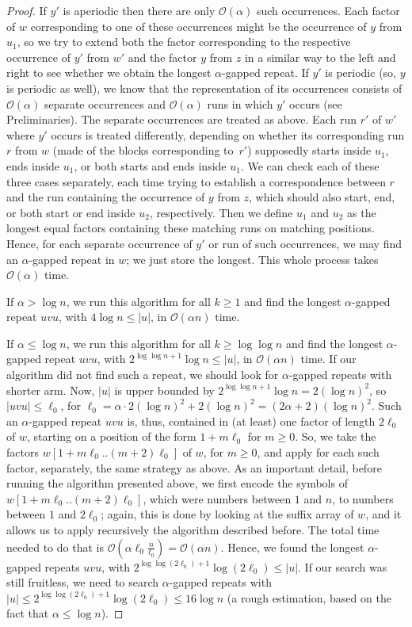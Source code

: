 \documentclass[final]{dmtcs-episciences}
\newcommand{\bigo}{{\mathcal O}}
\begin{document}
\begin{proof}
If $y'$ is aperiodic then there are only $\bigo(\alpha)$ such occurrences. Each factor of $w$ corresponding to one of these occurrences might be the occurrence of $y$ from $u_1$, so we try to extend both the factor corresponding to the respective occurrence of $y'$ from $w'$ and the factor $y$ from $z$ in a similar way to the left and right to see whether we obtain the longest $\alpha$-gapped repeat. If $y'$ is periodic (so, $y$ is periodic as well), we know that the representation of its occurrences consists of $\bigo(\alpha)$ separate occurrences and $\bigo(\alpha)$ runs in which $y'$ occurs (see Preliminaries). The separate occurrences are treated as above. Each run $r'$ of $w'$ where $y'$ occurs is treated differently, depending on whether its corresponding run $r$ from $w$ (made of the blocks corresponding to~$r'$) supposedly starts inside $u_1$, ends inside $u_1$, or both starts and ends inside $u_1$. We can check each of these three cases separately, each time trying to establish a correspondence between $r$ and the run containing the occurrence of $y$ from $z$, which should also start, end, or both start or end inside $u_2$, respectively. Then we define $u_1$ and $u_2$ as the longest equal factors containing these matching runs on matching positions. Hence, for each separate occurrence of $y'$ or run of such occurrences, we may find an $\alpha$-gapped repeat in $w$; we just store the longest. This whole process takes $\bigo(\alpha)$ time.

If $\alpha > \log n$, we run this algorithm for all $k\geq 1$ and find the longest $\alpha$-gapped repeat $uvu$, with $4\log n \leq |u|$, in $\bigo(\alpha n)$ time. 

If $\alpha \leq \log n$, we run this algorithm for all $k\geq \log \log n$ and find the longest $\alpha$-gapped repeat $uvu$, with $2^{\log\log n+1} \log n \leq |u|$, in $\bigo(\alpha n)$ time.  If our algorithm did not find such a repeat, we should look for $\alpha$-gapped repeats with shorter arm. Now, $|u|$ is upper bounded by $2^{\log\log n +1}\log n=2 (\log n)^2$, so $|uvu|\leq \ell_0$, for $\ell_0=\alpha\cdot 2(\log n)^2+2(\log n)^2=(2\alpha+2)(\log n)^2$. Such an $\alpha$-gapped repeat $uvu$ is, thus, contained in (at least) one factor of length $ 2\ell_0$ of $w$, starting on a position of the form $1+m\ell_0$ for $m\geq 0$.  So, we take the factors $w[1+m\ell_0..(m+2)\ell_0]$ of $w$, for $m\geq 0$, and apply for each such factor, separately, the same strategy as above. As an important detail, before running the algorithm presented above, we first encode the symbols of $w[1+m\ell_0..(m+2)\ell_0]$, which were numbers between $1$ and $n$, to numbers between $1$ and $2 \ell_0$; again, this is done by looking at the suffix array of $w$, and it allows us to apply recursively the algorithm described before. The total time needed to do that is $\bigo\left(\alpha\ell_0 \frac{n}{\ell_0}\right)=\bigo(\alpha n)$. Hence, we found the longest $\alpha$-gapped repeats $uvu$, with $2^{\log \log (2\ell_0) +1} \log (2\ell_0) \leq |u| $. If our search was still fruitless, we need to search $\alpha$-gapped repeats with $|u|\leq 2^{\log \log (2\ell_0) +1} \log (2\ell_0)\leq 16\log n$ (a rough estimation, based on the fact that $\alpha\leq \log n$). 


\end{proof}
\end{document}

